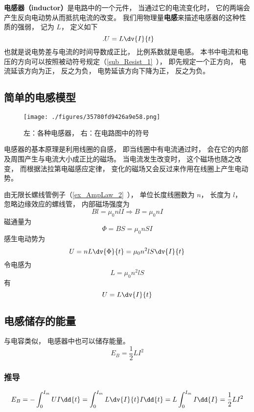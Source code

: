 
\begin{issues}
\issueAbstract
\end{issues}


\textbf{电感器（inductor）}是电路中的一个元件， 当通过它的电流变化时， 它的两端会产生反向电动势从而抵抗电流的改变。 我们用物理量\textbf{电感}来描述电感器的这种性质的强弱， 记为 $L$， 定义如下
\begin{equation}\label{eq_Induct_3}~.
U = L\dv{I}{t}
\end{equation}
也就是说电势差与电流的时间导数成正比， 比例系数就是电感。 本书中电流和电压的方向可以按照被动符号规定（\autoref{sub_Resist_1}~）， 即先规定一个正方向， 电流延该方向为正， 反之为负， 电势延该方向下降为正， 反之为负。

\subsection{简单的电感模型}

\begin{figure}[ht]
\centering
\texttt{[image: ./figures/35780fd9426a9e58.png]}
\caption{左：各种电感器， 右：在电路图中的符号} \label{fig_Induct_1}
\end{figure}
电感器的基本原理是利用线圈的自感， 即当线圈中有电流通过时， 会在它的内部及周围产生与电流大小成正比的磁场。 当电流发生改变时， 这个磁场也随之改变， 而根据法拉第电磁感应定律， 变化的磁场又会反过来作用在线圈上产生电动势。

由无限长螺线管例子（\autoref{ex_AmpLaw_2}~）， 单位长度线圈数为 $n$， 长度为 $l$， 忽略边缘效应的螺线管， 内部磁场强度为
\begin{equation}
Bl = \mu_0nlI \Rightarrow B = \mu_0nI
\end{equation}
磁通量为
\begin{equation}
\Phi = BS = \mu_0nSI
\end{equation}
感生电动势为
\begin{equation}
U = nL\dv{\Phi}{t} = \mu_0n^2lS \dv{I}{t}
\end{equation}
令电感为
\begin{equation}\label{eq_Induct_1}
L = \mu_0n^2lS
\end{equation}
有
\begin{equation}\label{eq_Induct_2}
U = L\dv{I}{t}
\end{equation}

\subsection{电感储存的能量}
与电容类似， 电感器中也可以储存能量。
\begin{equation}
E_B = \frac{1}{2}L I^2
\end{equation}

\subsubsection{推导}
\begin{equation}
E_B = -\int_0^{I_m} U I \dd{t} = \int_0^{I_m} L \dv{I}{t} I \dd{t} = L\int_0^{I_m} I \dd{I} = \frac{1}{2} L I^2
\end{equation}
